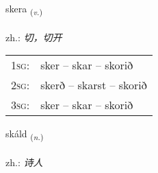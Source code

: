 \documentclass[frontgrid, backgrid]{flacards}\usepackage[]{graphicx}\usepackage[]{xcolor}
\begin{document}
\renewcommand{\flhead}{\vskip5pt \fboxsep=0pt {\small\bfseries\footnotesize Sagnorð | 动词}}
\renewcommand{\fcfoot}{\vskip5pt \fboxsep=0pt \hspace{2pt}{\small\bfseries\footnotesize 1K}}

\renewcommand{\blhead}{\vskip5pt {\small\bfseries\footnotesize Sagnorð | 动词 }}
\renewcommand{\bcfoot}{\vskip5pt \hspace{2pt}{\small\bfseries\footnotesize 1K}}


{skera \small{\textsubscript{(\textit{v.})}} \\[1ex] %
\textphonetic{[scɛːra]} \\
zh.: \emph{切，切开} \\  [2ex]
\renewcommand*{\arraystretch}{0.8}
\begin{tabular}{p{1cm}l}
\textsc{1sg}: & sker -- skar -- skorið \\ 
\textsc{2sg}: & skerð -- skarst -- skorið \\ 
\textsc{3sg}: & sker -- skar -- skorið \\ 
\end{tabular}
}

\renewcommand{\flhead}{\vskip5pt \fboxsep=0pt {\small\bfseries\footnotesize Nafnorð | 名词}}
\renewcommand{\fcfoot}{\vskip5pt \fboxsep=0pt \hspace{2pt}{\small\bfseries\footnotesize 1K}}

\renewcommand{\blhead}{\vskip5pt {\small\bfseries\footnotesize Nafnorð | 名词 }}
\renewcommand{\bcfoot}{\vskip5pt \hspace{2pt}{\small\bfseries\footnotesize 1K}}


{skáld \small{\textsubscript{(\textit{n.})}} \\[1ex] %
\textphonetic{[skault]} \\
zh.: \emph{诗人} \\  [2ex]
\renewcommand*{\arraystretch}{0.8}
}
\end{document}
